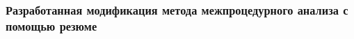 \documentclass[hyperref={pdfpagelabels=false},10pt,gray]{beamer}
\begin{document}
\begin{frame}
\frametitle{Разработанная модификация метода межпроцедурного анализа с помощью резюме}
\begin{figure}[h]
\end{figure}
\end{frame}
\end{document}
